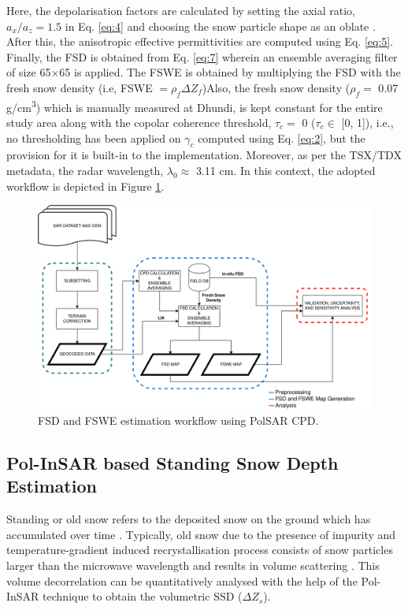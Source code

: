 \documentclass[review]{elsarticle}
\numberwithin{equation}{section}
\numberwithin{figure}{section}
\numberwithin{table}{section}
\begin{document}
Here, the depolarisation factors are calculated by setting the axial ratio, $a_x/a_z = 1.5$ in
Eq. \eqref{eq:4} and choosing the snow particle shape as an oblate \citep{Majumdar2019}. After this, the anisotropic
effective permittivities are computed using Eq. \eqref{eq:5}. Finally, the FSD is obtained from Eq. \eqref{eq:7} wherein an ensemble averaging filter of size 65$\times$65 is applied. The FSWE is obtained by multiplying the FSD with the fresh snow density (i.e, FSWE $ = \rho_f\Delta{Z_f}$)Also, the fresh snow density ($\rho_f = $ 0.07 g/cm\textsuperscript{3}) which is manually measured at Dhundi, is kept constant for the entire study area along with the copolar coherence threshold, $\tau_c = $ 0 ($\tau_c \in$ [0, 1]), i.e., no thresholding has been applied on $\gamma_c$ computed using Eq. \eqref{eq:2}, but the provision for it is built-in to the implementation. Moreover, as per the TSX/TDX metadata, the radar wavelength, $\lambda_0 \approx$ 3.11 cm. In this context, the adopted workflow is depicted in Figure \ref{fig:fsd_method}.

\begin{figure}[htb]
    \centering
    \includegraphics[width=\textwidth]{Figures/Methods/FSD_Method.png}
    \caption{FSD and FSWE estimation workflow using PolSAR CPD.}
    \label{fig:fsd_method}
\end{figure}

\subsection{Pol-InSAR based Standing Snow Depth Estimation}
\label{ssec:ssd}

Standing or old snow refers to the deposited snow on the ground which has accumulated over time \citep{Reynolds1983}. Typically, old snow due to the presence of impurity and temperature-gradient induced recrystallisation process consists of snow particles larger than the microwave wavelength and results in volume scattering \citep{Leinss2016, Riche2013}. This volume decorrelation can be quantitatively analysed with the help of the Pol-InSAR technique \citep{Cloude2010} to obtain the volumetric SSD ($\Delta{Z_s}$). 
\end{document}
